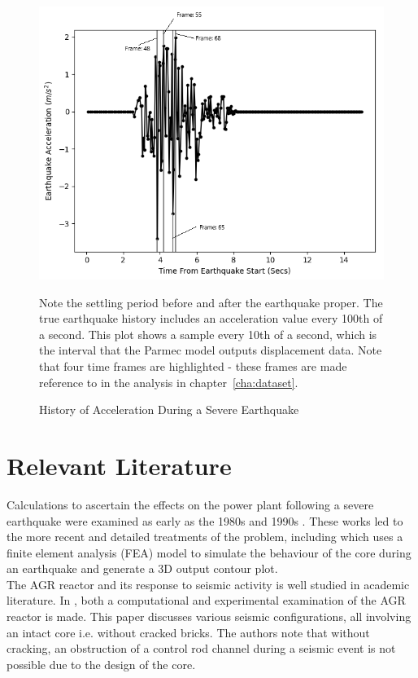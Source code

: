 \begin{figure}[ht]
	\centering
	\includegraphics[scale=0.85]{Figures/earthquake_time_points}
	\caption{History of Acceleration During a Severe Earthquake} {Note the settling period before and after the earthquake proper. The true earthquake history includes an acceleration value every 100th of a second. This plot shows a sample every 10th of a second, which is the interval that the Parmec model outputs displacement data. Note that four time frames are highlighted - these frames are made reference to in the analysis in chapter~\ref{cha:dataset}.}
	\label{fig:earthquake}
\end{figure}




\section{Relevant Literature} \label{engineering:literature}

Calculations to ascertain the effects on the power plant following a severe earthquake were examined as early as the 1980s \cite{ahmed1986seismic} and 1990s \cite{allen1990seismic}. These works led to the more recent and detailed treatments of the problem, including \cite{kralj2007seismic} which uses a finite element analysis (FEA) model \cite{zienkiewicz2005finite} to simulate the behaviour of the core during an earthquake and generate a 3D output contour plot. \\

\noindent
The AGR reactor and its response to seismic activity is well studied in academic literature. In \cite{voyagaki2018earthquake}, both a computational and experimental examination of the AGR reactor is made. This paper discusses various seismic configurations, all involving an intact core i.e. without cracked bricks. The authors note that without cracking, an obstruction of a control rod channel during a seismic event is not possible due to the design of the core. \\

